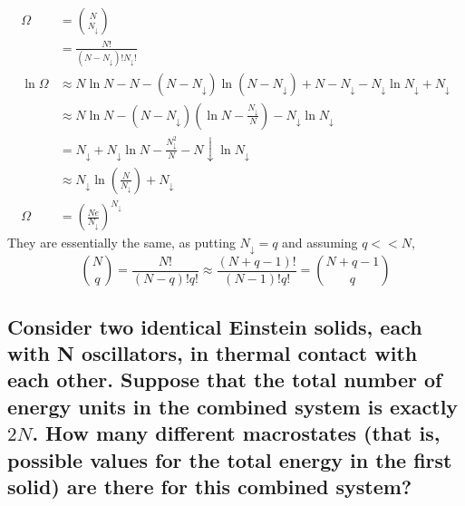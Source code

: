\documentclass[answers]{exam}
\begin{document}
\begin{questions}

\begin{solution}
    \begin{align*}
        \Omega &= \binom{N}{N_\downarrow} \\
               &= \frac{N!}{(N-N_\downarrow)!N_\downarrow!} \\
        \ln\Omega &\approx N\ln N - N - (N-N_\downarrow)\ln(N-N_\downarrow) + N - N_\downarrow - N_\downarrow\ln N_\downarrow + N_\downarrow \\
                  &\approx N\ln N - (N-N_\downarrow)\left(\ln N - \frac{N_\downarrow}{N}\right) - N_\downarrow\ln N_\downarrow \\
                  &= N_\downarrow + N_\downarrow\ln N - \frac{N_\downarrow^2}{N} - N\downarrow\ln N_\downarrow \\
                  &\approx N_\downarrow\ln\left(\frac{N}{N_\downarrow}\right) + N_\downarrow \\
        \Omega &= \left(\frac{Ne}{N_\downarrow}\right)^{N_\downarrow}
    \end{align*}
    They are essentially the same, as putting $N_\downarrow = q$ and assuming $q<<N$,
    $$\binom{N}{q} = \frac{N!}{(N-q)!q!} \approx \frac{(N+q-1)!}{(N-1)!q!} = \binom{N+q-1}{q}$$
\end{solution}


\begin{parts}
    \part{Consider two identical Einstein solids, each with N oscillators, in thermal contact with each other. Suppose that the total number of energy units in the combined system is exactly $2N$. How many different macrostates (that is, possible values for the total energy in the first solid) are there for this combined system?}

\end{parts}
\end{questions}
\end{document}
